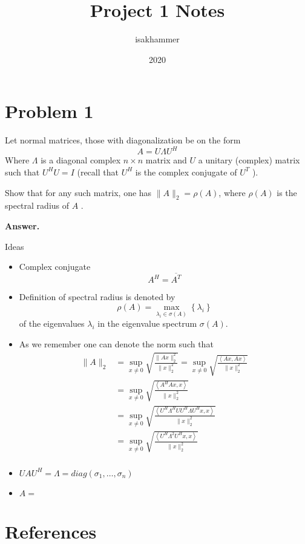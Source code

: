 \documentclass{article}
\title{Project 1 Notes}
\author{isakhammer }
\date{2020}
\theoremstyle{remark}
\newcommand{\newpara}
  {
  \vskip 0.4cm
  }
\begin{document}
\maketitle
\tableofcontents
\newpage

\newpage
\section{Problem 1}%
\label{sec:problem_1}

Let normal matrices, those with diagonalization be on the form \[
A = U \Lambda U^{H} 
\] 
Where $\Lambda $ is a diagonal complex $n\times n $ matrix and $U$ a unitary (complex) matrix such that $U ^{H} U = I$ (recall that $U^{H}$ is the complex conjugate of $U^{T}$ ).
\newpara
Show that for any such matrix, one has $\|A\|_{2} = \rho \left( A \right)$, where $\rho \left( A \right) $ is the spectral radius of $A$ .


\begin{tcolorbox}
  \textbf{Answer.} 
  \newpara Ideas
  \begin{itemize}
    \item Complex conjugate \[
     A^{H} = \overline{A^{T}} 
    \] 
    \item  Definition of spectral radius is denoted by \[
        \rho \left( A \right) = \max_{\lambda _{i} \in  \sigma \left( A \right)} \left\{ \lambda _{i} \right\}
    \] 
    of the eigenvalues $\lambda _{i}$ in the eigenvalue spectrum $\sigma \left( A \right)$.
  
  \item As we remember one can denote the norm such that \[
      \begin{split}
      \|A\|_{2}  & = \sup_{x \neq 0}  \sqrt{\frac{\|Ax\|_{2}^{2}}{\|x\|^{2}_2}    } = \sup _{x \neq0}  \sqrt{\frac{ \left<Ax, Ax \right> }{\|x\|_{2}^{2}}}    \\
       & = \sup _{x \neq0}  \sqrt{\frac{ \left<A^{H}Ax, x \right> }{\|x\|_{2}^{2}}} \\
       & = \sup _{x \neq0}  \sqrt{\frac{ \left<U^{H}\Lambda ^{H} U U^{H} \Lambda U^{H}x, x \right> }{\|x\|_{2}^{2}}}\\
       & = \sup _{x \neq0}  \sqrt{\frac{\left<U^{H} \Lambda ^2 U^{H}x, x \right>}{\|x\|_{2}^{2}}}\\
      \end{split} 
  \] 
\item $UAU^{H}  = \Lambda = diag\left( \sigma _{1} , \ldots , \sigma _{n} \right) $ 
\item  $A  =  $
 
  
  
  \end{itemize}
\end{tcolorbox}




\newpage
\section{References}%
\label{sec:references}



\end{document}
